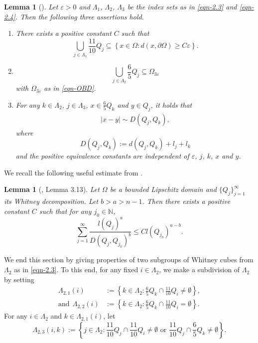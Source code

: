\documentclass[11pt,twoside]{article}
\def\nn{{\mathbb N}}
\def\Qi{\frac{11}{10}Q_i}
\def\Qkk{\frac{6}{5}Q_k}
\def\Qj{\frac{11}{10}Q_j}
\def\blz{\Lambda}
\def\boz{{\Omega}}
\def\pa{\partial}                %
\theoremstyle{mylem}
\newtheorem{lemma}[theorem]{Lemma}
\theoremstyle{definition}
\numberwithin{equation}{section}
\begin{document}
\begin{lemma}[\cite{cjlz2022}]\label{lem2.2}
Let \( \varepsilon > 0 \) and \( \blz_1 \), \( \blz_2 \), \(\Lambda_3\) be the index sets as in \eqref{eqn-2.3} and \eqref{eqn-2.4}. Then the following three assertions hold.
\begin{enumerate}
\item[\rm(i)]There exists a positive constant $C$ such that
\begin{equation}\label{eqn-2.5}
\bigcup_{j \in \blz_1} \frac{11}{10}Q_j \subseteq \left\{ x \in \boz : d(x, \pa\boz) \geq C\varepsilon \right\}.
\end{equation}
\item[\rm(ii)]\begin{equation}\label{eqn-2.6}
\bigcup_{j \in \blz_2} \frac{6}{5}Q_j \subseteq \boz_{3\varepsilon} 
\end{equation}
with \( \boz_{3\varepsilon} \) as in \eqref{eqn-OBD}.
\item[\rm(iii)]For any \( k \in \blz_2 \), \( j \in \blz_3 \), \( x \in \Qkk \) and \( y \in Q_j \), it holds that
\begin{align*}
|x - y| \sim D(Q_j, Q_k),
\end{align*}
where 
$$D(Q_j, Q_k) := d(Q_j, Q_k) + l_j + l_k$$
and the positive equivalence constants are independent of \( \varepsilon \), \( j \), \( k \), \( x \) and \( y \).
\end{enumerate}
\end{lemma}

We recall the following useful estimate from \cite{pt2015}.

\begin{lemma}[\cite{pt2015}, Lemma 3.13]\label{lem2.3}
Let \( \boz \) be a bounded Lipschitz domain and \( \{Q_j\}_{j=1}^{\infty} \) its Whitney decomposition. Let $b>a>n-1$. Then there exists a positive constant \( C \) such that for any $j_0\in\nn$,
\[
\sum_{j=1}^{\infty} \frac{l(Q_j)^a}{D(Q_j, Q_{j_0})^{b}} \leq Cl(Q_{j_0})^{a-b}.
\]
\end{lemma}	

We end this section by giving properties of two subgroups of Whitney cubes from \( \blz_2 \) as in \eqref{eqn-2.3}. 
To this end, for any fixed \( i \in \blz_2 \), we make a subdivision of \( \blz_2 \) by setting
\begin{equation}
\label{eqn-2.8}
\begin{aligned}
\blz_{2,1}(i) &:= \left\{ k \in \blz_2 : \Qkk \cap \Qi \neq \emptyset \right\}, \\
\text{and}\ \ \blz_{2,2}(i) &:= \left\{ k \in \blz_2 : \Qkk \cap \Qi = \emptyset \right\}.
\end{aligned}
\end{equation}
For any \( i \in \blz_2 \) and \( k \in \blz_{2,1}(i) \), let
\begin{equation}\label{eqn-2.9}
\blz_{2,3}(i,k) := \left\{ j \in \blz_2 : \Qj \cap \Qi \neq \emptyset \text{ or } \Qj \cap \Qkk \neq \emptyset \right\}.
\end{equation}
\end{document}
